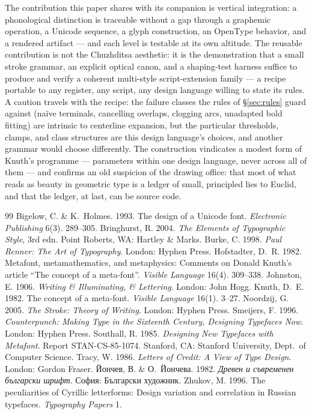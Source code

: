 \documentclass[11pt]{article}
\begin{document}
The contribution this paper shares with its companion is vertical integration: a phonological distinction is traceable without a gap through a graphemic operation, a Unicode sequence, a glyph construction, an OpenType behavior, and a rendered artifact — and each level is testable at its own altitude. The reusable contribution is not the Chuzhditsa aesthetic: it is the demonstration that a small stroke grammar, an explicit optical canon, and a shaping-test harness suffice to produce and verify a coherent multi-style script-extension family — a recipe portable to any register, any script, any design language willing to state its rules. A caution travels with the recipe: the failure classes the rules of \S\ref{sec:rules} guard against (naïve terminals, cancelling overlaps, clogging arcs, unadapted bold fitting) are intrinsic to centerline expansion, but the particular thresholds, clamps, and class structures are this design language's choices, and another grammar would choose differently. The construction vindicates a modest form of Knuth's programme — parameters within one design language, never across all of them — and confirms an old suspicion of the drawing office: that most of what reads as beauty in geometric type is a ledger of small, principled lies to Euclid, and that the ledger, at last, can be source code.

\begin{thebibliography}{99}
 Bigelow, C. \& K.~Holmes. 1993. The design of a Unicode font. \emph{Electronic Publishing} 6(3). 289--305.
 Bringhurst, R. 2004. \emph{The Elements of Typographic Style}, 3rd edn. Point Roberts, WA: Hartley \& Marks.
 Burke, C. 1998. \emph{Paul Renner: The Art of Typography}. London: Hyphen Press.
 Hofstadter, D.~R. 1982. Metafont, metamathematics, and metaphysics: Comments on Donald Knuth's article ``The concept of a meta-font''. \emph{Visible Language} 16(4). 309--338.
 Johnston, E. 1906. \emph{Writing \& Illuminating, \& Lettering}. London: John Hogg.
 Knuth, D.~E. 1982. The concept of a meta-font. \emph{Visible Language} 16(1). 3--27.
 Noordzij, G. 2005. \emph{The Stroke: Theory of Writing}. London: Hyphen Press.
 Smeijers, F. 1996. \emph{Counterpunch: Making Type in the Sixteenth Century, Designing Typefaces Now}. London: Hyphen Press.
 Southall, R. 1985. \emph{Designing New Typefaces with Metafont}. Report STAN-CS-85-1074. Stanford, CA: Stanford University, Dept.\ of Computer Science.
 Tracy, W. 1986. \emph{Letters of Credit: A View of Type Design}. London: Gordon Fraser.
 Йончев, В. \& О.~Йончева. 1982. \emph{Древен и съвременен български шрифт}. София: Български художник.
 Zhukov, M. 1996. The peculiarities of Cyrillic letterforms: Design variation and correlation in Russian typefaces. \emph{Typography Papers} 1.
\end{thebibliography}
\end{document}
